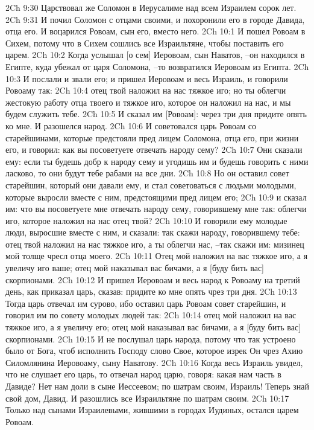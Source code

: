 2Ch 9:30  Царствовал же Соломон в Иерусалиме над всем Израилем сорок лет.
2Ch 9:31  И почил Соломон с отцами своими, и похоронили его в городе Давида, отца его. И воцарился Ровоам, сын его, вместо него.
2Ch 10:1  И пошел Ровоам в Сихем, потому что в Сихем сошлись все Израильтяне, чтобы поставить его царем.
2Ch 10:2  Когда услышал [о сем] Иеровоам, сын Наватов, --он находился в Египте, куда убежал от царя Соломона, --то возвратился Иеровоам из Египта.
2Ch 10:3  И послали и звали его; и пришел Иеровоам и весь Израиль, и говорили Ровоаму так:
2Ch 10:4  отец твой наложил на нас тяжкое иго; но ты облегчи жестокую работу отца твоего и тяжкое иго, которое он наложил на нас, и мы будем служить тебе.
2Ch 10:5  И сказал им [Ровоам]: через три дня придите опять ко мне. И разошелся народ.
2Ch 10:6  И советовался царь Ровоам со старейшинами, которые предстояли пред лицем Соломона, отца его, при жизни его, и говорил: как вы посоветуете отвечать народу сему?
2Ch 10:7  Они сказали ему: если ты будешь добр к народу сему и угодишь им и будешь говорить с ними ласково, то они будут тебе рабами на все дни.
2Ch 10:8  Но он оставил совет старейшин, который они давали ему, и стал советоваться с людьми молодыми, которые выросли вместе с ним, предстоящими пред лицем его;
2Ch 10:9  и сказал им: что вы посоветуете мне отвечать народу сему, говорившему мне так: облегчи иго, которое наложил на нас отец твой?
2Ch 10:10  И говорили ему молодые люди, выросшие вместе с ним, и сказали: так скажи народу, говорившему тебе: отец твой наложил на нас тяжкое иго, а ты облегчи нас, --так скажи им: мизинец мой толще чресл отца моего.
2Ch 10:11  Отец мой наложил на вас тяжкое иго, а я увеличу иго ваше; отец мой наказывал вас бичами, а я [буду бить вас] скорпионами.
2Ch 10:12  И пришел Иеровоам и весь народ к Ровоаму на третий день, как приказал царь, сказав: придите ко мне опять чрез три дня.
2Ch 10:13  Тогда царь отвечал им сурово, ибо оставил царь Ровоам совет старейшин, и говорил им по совету молодых людей так:
2Ch 10:14  отец мой наложил на вас тяжкое иго, а я увеличу его; отец мой наказывал вас бичами, а я [буду бить вас] скорпионами.
2Ch 10:15  И не послушал царь народа, потому что так устроено было от Бога, чтоб исполнить Господу слово Свое, которое изрек Он чрез Ахию Силомлянина Иеровоаму, сыну Наватову.
2Ch 10:16  Когда весь Израиль увидел, что не слушает его царь, то отвечал народ царю, говоря: какая нам часть в Давиде? Нет нам доли в сыне Иессеевом; по шатрам своим, Израиль! Теперь знай свой дом, Давид. И разошлись все Израильтяне по шатрам своим.
2Ch 10:17  Только над сынами Израилевыми, жившими в городах Иудиных, остался царем Ровоам.
